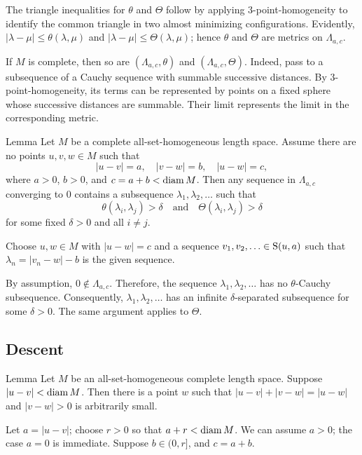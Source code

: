 \documentclass[a4paper,10pt]{article}
\begin{document}
The triangle inequalities for $\theta$ and $\Theta$ follow by applying $3$-point-homogeneity to identify the common triangle in two almost minimizing configurations. Evidently, $|\lambda-\mu|\leqslant \theta(\lambda,\mu)$ and $|\lambda-\mu|\leqslant \Theta(\lambda,\mu)$; hence $\theta$ and $\Theta$ are metrics on $\Lambda_{a,c}$.


If $M$ is complete, then so are $(\Lambda_{a,c},\theta)$ and $(\Lambda_{a,c},\Theta)$.
Indeed, pass to a subsequence of a Cauchy sequence with summable
successive distances.
By $3$-point-homogeneity, its terms can be represented by points
on a fixed sphere whose successive distances are summable.
Their limit represents the limit in the corresponding metric.

\begin{thm}{Lemma}\label{lem:cauchy-radius}
Let $M$ be a complete all-set-homogeneous length space.
Assume there are no points $u,v,w\in M$ such that
\[
|u-v|=a,\quad |v-w|=b,\quad |u-w|=c,
\]
where $a>0$, $b>0$, and $c=a+b<\mathop{\rm diam}\nolimits M$.
Then any sequence in $\Lambda_{a,c}$ converging to $0$ contains a subsequence $\lambda_1,\lambda_2,\ldots$
such that
\[\theta(\lambda_i,\lambda_j)>\delta
\quad\text{and}\quad
\Theta(\lambda_i,\lambda_j)>\delta
\]
for some fixed $\delta>0$ and all $i\ne j$.
\end{thm}

Choose $u,w\in M$ with $|u-w|=c$ and a sequence $v_1,v_2,\ldots\in\mathrm{S}(u,a)$ such that $\lambda_n=|v_n-w|- b$ is the given sequence.

By assumption, $0\notin\Lambda_{a,c}$.
Therefore, the sequence $\lambda_1,\lambda_2,\ldots$ has no $\theta$-Cauchy subsequence.
Consequently, $\lambda_1,\lambda_2,\ldots$ has an infinite $\delta$-separated
subsequence for some $\delta>0$. The same argument applies to $\Theta$.
\qeds



\subsection*{Descent}

\begin{thm}{Lemma}\label{lem:plus-eps}
Let $M$ be an all-set-homogeneous complete length space.
Suppose $|u-v|<\mathop{\rm diam}\nolimits M$.
Then there is a point $w$ such that
$|u-v|+|v-w|=|u-w|$ and $|v-w|>0$ is arbitrarily small.
\end{thm}

Let $a=|u-v|$; choose $r>0$ so that $a+r<\mathop{\rm diam}\nolimits M$.
We can assume $a>0$; the case $a=0$ is immediate.
Suppose $b\in(0,r]$, and $c=a+b$.
\end{document}
